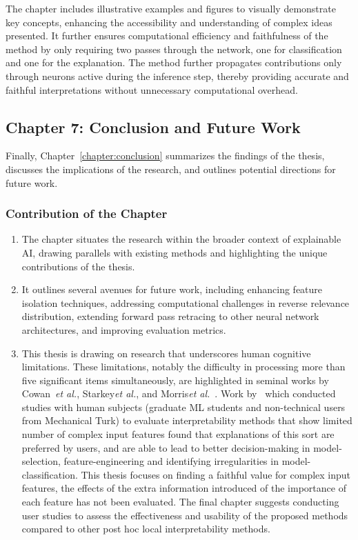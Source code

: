 The chapter includes illustrative examples and figures to visually demonstrate key concepts, enhancing the accessibility and understanding of complex ideas presented. It further ensures computational efficiency and faithfulness of the \CTC\/ method by only requiring two passes through the network, one for classification and one for the explanation. The method further propagates contributions only through neurons active during the inference step, thereby providing accurate and faithful interpretations without unnecessary computational overhead.

\subsection{Chapter 7: Conclusion and Future Work}

Finally, Chapter~\ref{chapter:conclusion} summarizes the findings of the thesis, discusses the implications of the research, and outlines potential directions for future work.

\subsubsection*{Contribution of the Chapter}

\begin{enumerate}
    \item The chapter situates the research within the broader context of explainable AI, drawing parallels with existing methods and highlighting the unique contributions of the thesis.
    \item It outlines several avenues for future work, including enhancing feature isolation techniques, addressing computational challenges in reverse relevance distribution, extending forward pass retracing to other neural network architectures, and improving evaluation metrics.
    \item This thesis is drawing on research that underscores human cognitive limitations. These limitations, notably the difficulty in processing more than five significant items simultaneously, are highlighted in seminal works by Cowan~\textit{et al.}\cite{cowan2001magical}, Starkey\textit{et al.}\cite{starkey1995development}, and Morris\textit{et al.}~\cite{morris2018human}. Work by~\cite{Ribeiro0G16} which conducted studies with human subjects (graduate ML students and non-technical users from Mechanical Turk) to evaluate interpretability methods that show limited number of complex input features found that explanations of this sort are preferred by users, and are able to lead to better decision-making in model-selection, feature-engineering and identifying irregularities in model-classification. This thesis focuses on finding a faithful value for complex input features, the effects of the extra information introduced of the importance of each feature has not been evaluated. The final chapter suggests conducting user studies to assess the effectiveness and usability of the proposed methods compared to other post hoc local interpretability methods.
\end{enumerate}




